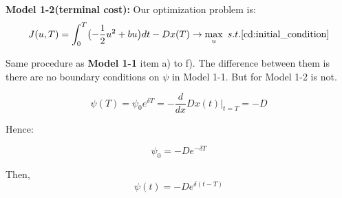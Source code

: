 \documentclass{article}
\begin{document}
{\bf Model 1-2(terminal cost):} Our optimization problem is:
\begin{equation}
    J(u,T)=\int_{0}^{T}\bigl(-\frac{1}{2}u^2+bu\bigr)dt-Dx(T)\rightarrow \max_{u}\ s.t. \eqref{cd:initial_condition}
\end{equation}

Same procedure as \textbf{Model 1-1} item a) to f). The difference between them is there are no boundary conditions on $\psi$ in Model 1-1. But for Model 1-2 is not.

\begin{equation}
    \psi(T)=\psi_0 e^{\delta T}=-\frac{d}{dx}Dx(t)\bigg|_{t=T}=-D
\end{equation}


Hence:

\begin{equation}\label{eq1-2:psi0}
    \psi_0=-De^{-\delta T}
\end{equation}

Then,
\begin{equation}\label{eq1-2:psi}
    \psi(t)=-De^{\delta (t-T)}
\end{equation}
\end{document}
